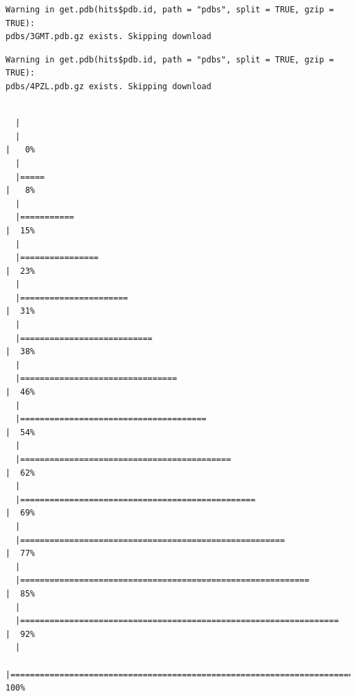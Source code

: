 \documentclass[
  letterpaper,
  DIV=11,
  numbers=noendperiod]{scrartcl}
\begin{document}
\begin{verbatim}
Warning in get.pdb(hits$pdb.id, path = "pdbs", split = TRUE, gzip = TRUE):
pdbs/3GMT.pdb.gz exists. Skipping download
\end{verbatim}

\begin{verbatim}
Warning in get.pdb(hits$pdb.id, path = "pdbs", split = TRUE, gzip = TRUE):
pdbs/4PZL.pdb.gz exists. Skipping download
\end{verbatim}

\begin{verbatim}

  |                                                                            
  |                                                                      |   0%
  |                                                                            
  |=====                                                                 |   8%
  |                                                                            
  |===========                                                           |  15%
  |                                                                            
  |================                                                      |  23%
  |                                                                            
  |======================                                                |  31%
  |                                                                            
  |===========================                                           |  38%
  |                                                                            
  |================================                                      |  46%
  |                                                                            
  |======================================                                |  54%
  |                                                                            
  |===========================================                           |  62%
  |                                                                            
  |================================================                      |  69%
  |                                                                            
  |======================================================                |  77%
  |                                                                            
  |===========================================================           |  85%
  |                                                                            
  |=================================================================     |  92%
  |                                                                            
  |======================================================================| 100%
\end{verbatim}
\end{document}
